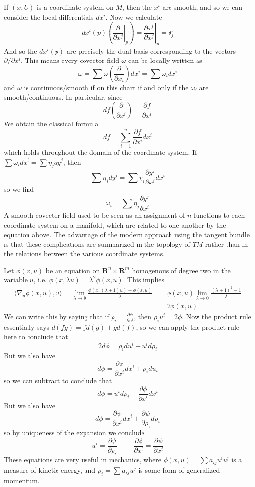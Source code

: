 If $(x,U)$ is a coordinate system on $M$, then the $x^i$ are smooth, and so we can consider the local differentials $dx^i$. Now we calculate
%
\[ dx^i(p) \left( \left. \frac{\partial}{\partial x^j} \right|_p \right) = \left. \frac{\partial x^i}{\partial x^j} \right|_p = \delta^i_j \]
%
And so the $dx^i(p)$ are precisely the dual basis corresponding to the vectors $\partial/\partial x^i$. This means every covector field $\omega$ can be locally written as
%
\[ \omega = \sum \omega \left( \frac{\partial}{\partial x_i} \right) dx^i = \sum \omega_i dx^i \]
%
and $\omega$ is continuous/smooth if on this chart if and only if the $\omega_i$ are smooth/continuous. In particular, since
%
\[ df \left( \frac{\partial}{\partial x^i} \right) = \frac{\partial f}{\partial x^i} \]
%
We obtain the classical formula
%
\[ df = \sum_{i = 1}^n \frac{\partial f}{\partial x^i} dx^i \]
%
which holds throughout the domain of the coordinate system. If $\sum \omega_i dx^i = \sum \eta_j dy^j$, then
%
\[ \sum \eta_j dy^j = \sum \eta_j \frac{\partial y^j}{\partial x^i} dx^i \]
%
so we find
%
\[ \omega_i = \sum \eta_j \frac{\partial y^j}{\partial x^i} \]
%
A smooth covector field used to be seen as an assignment of $n$ functions to each coordinate system on a manifold, which are related to one another by the equation above. The advantage of the modern approach using the tangent bundle is that these complications are summarized in the topology of $TM$ rather than in the relations between the various coordinate systems.

\begin{example}
    Let $\phi(x,u)$ be an equation on $\mathbf{R}^n \times \mathbf{R}^m$ homogenous of degree two in the variable $u$, i.e. $\phi(x,\lambda u) = \lambda^2 \phi(x,u)$. This implies
    \begin{align*}
        \langle \nabla_u \phi(x,u), u \rangle = \lim_{\lambda \to 0} \frac{\phi(x,(\lambda + 1)u) - \phi(x,u)}{\lambda} &= \phi(x,u) \lim_{\lambda \to 0} \frac{(\lambda + 1)^2 - 1}{\lambda}\\
        &= 2 \phi(x,u)
    \end{align*}
    We can write this by saying that if $\rho_i = \frac{\partial \phi}{\partial u^i}$, then $\rho_i u^i = 2 \phi$. Now the product rule essentially says $d(fg) = fd(g) + gd(f)$, so we can apply the product rule here to conclude that
    \[ 2 d\phi = \rho_i du^i + u^i d \rho_i \]
    But we also have
    \[ d\phi = \frac{\partial \phi}{\partial x^i} dx^i + \rho_i d u_i \]
    so we can subtract to conclude that
    \[ d\phi = u^i d \rho_i - \frac{\partial \phi}{\partial x^i} dx^i \]
    But we also have
    \[ d\phi = \frac{\partial \psi}{\partial x^i} dx^i + \frac{\partial \psi}{\partial \rho_i} d\rho_i \]
    so by uniqueness of the expansion we conclude
    \[ u^i = \frac{\partial \psi}{\partial \rho_i}\ \ \ \ \ - \frac{\partial \phi}{\partial x^i} = \frac{\partial \psi}{\partial x^i} \]
    These equations are very useful in mechanics, where $\phi(x,u) = \sum a_{ij} u^i u^j$ is a measure of kinetic energy, and $\rho_i = \sum a_{ij} u^j$ is some form of generalized momentum.
\end{example}

